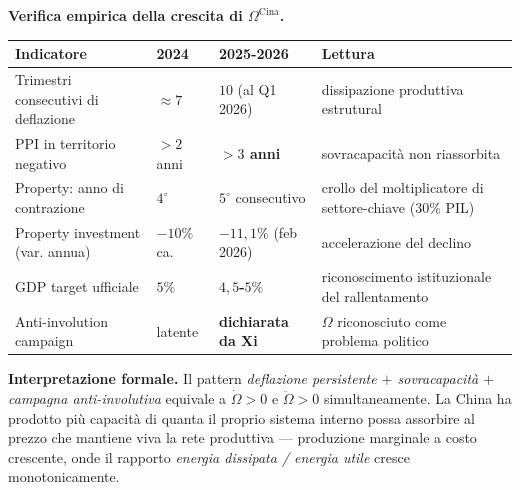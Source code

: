 \Proved{} \textbf{Verifica empirica della crescita di
\(\Omega^{\text{Cina}}\).}

{\def\LTcaptype{none} %
{\small\begin{longtable}[]{@{}
  >{\raggedright\arraybackslash}p{}
  >{\raggedright\arraybackslash}p{}
  >{\raggedright\arraybackslash}p{}
  >{\raggedright\arraybackslash}p{}@{}}
\toprule\noalign{}
\begin{minipage}[b]{\linewidth}\raggedright
Indicatore
\end{minipage} & \begin{minipage}[b]{\linewidth}\raggedright
2024
\end{minipage} & \begin{minipage}[b]{\linewidth}\raggedright
2025-2026
\end{minipage} & \begin{minipage}[b]{\linewidth}\raggedright
Lettura
\end{minipage} \\
\midrule\noalign{}
\endhead
\bottomrule\noalign{}
\endlastfoot
Trimestri consecutivi di deflazione & \(\approx 7\) & \textbf{\(10\)}
(al Q1 2026) & dissipazione produttiva estrutural \\
PPI in territorio negativo & \(> 2\) anni & \textbf{\(> 3\) anni} &
sovracapacità non riassorbita \\
Property: anno di contrazione & \(4^\circ\) & \textbf{\(5^\circ\)} consecutivo &
crollo del moltiplicatore di settore-chiave (30\% PIL) \\
Property investment (var. annua) & \(-10\%\) ca. &
\textbf{\(-11{,}1\%\)} (feb 2026) & accelerazione del declino \\
GDP target ufficiale & \(5\%\) & \textbf{\(4{,}5\)-\(5\%\)} &
riconoscimento istituzionale del rallentamento \\
Anti-involution campaign & latente & \textbf{dichiarata da Xi} &
\(\Omega\) riconosciuto come problema politico \\
\end{longtable}}
}

\Hypoth{} \textbf{Interpretazione formale.} Il pattern \emph{deflazione
persistente \(+\) sovracapacità \(+\) campagna anti-involutiva} equivale
a \(\dot\Omega > 0\) e \(\ddot\Omega > 0\) simultaneamente. La China ha
prodotto più capacità di quanta il proprio sistema interno possa
assorbire al prezzo che mantiene viva la rete produttiva --- produzione
marginale a costo crescente, onde il rapporto \emph{energia dissipata /
energia utile} cresce monotonicamente.


